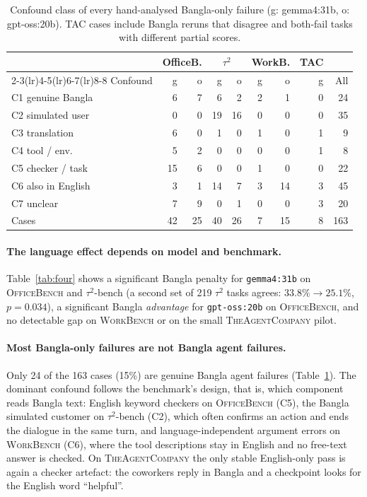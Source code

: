 \documentclass[11pt]{article}
\begin{document}
\begin{table}[t]
\centering\footnotesize
\setlength{\tabcolsep}{2.6pt}
\begin{tabular}{lrrrrrrrr}
\toprule
 & \multicolumn{2}{c}{OfficeB.} & \multicolumn{2}{c}{$\tau^2$} & \multicolumn{2}{c}{WorkB.} & TAC & \\
\cmidrule(lr){2-3}\cmidrule(lr){4-5}\cmidrule(lr){6-7}\cmidrule(lr){8-8}
Confound & g & o & g & o & g & o & g & All \\
\midrule
C1 genuine Bangla    & 6  & 7 & 6  & 2  & 2 & 1  & 0 & 24 \\
C2 simulated user    & 0  & 0 & 19 & 16 & 0 & 0  & 0 & 35 \\
C3 translation       & 6  & 0 & 1  & 0  & 1 & 0  & 1 & 9 \\
C4 tool / env.       & 5  & 2 & 0  & 0  & 0 & 0  & 1 & 8 \\
C5 checker / task    & 15 & 6 & 0  & 0  & 1 & 0  & 0 & 22 \\
C6 also in English   & 3  & 1 & 14 & 7  & 3 & 14 & 3 & 45 \\
C7 unclear           & 7  & 9 & 0  & 1  & 0 & 0  & 3 & 20 \\
\midrule
Cases                & 42 & 25 & 40 & 26 & 7 & 15 & 8 & 163 \\
\bottomrule
\end{tabular}
\caption{Confound class of every hand-analysed Bangla-only failure (g: gemma4:31b, o:
gpt-oss:20b). TAC cases include Bangla reruns that disagree and both-fail tasks with different
partial scores.}
\label{tab:confound}
\end{table}

\paragraph{The language effect depends on model and benchmark.} Table~\ref{tab:four} shows a
significant Bangla penalty for \texttt{gemma4:31b} on \textsc{OfficeBench} and $\tau^2$-bench
(a second set of 219 $\tau^2$ tasks agrees: $33.8\%\to25.1\%$, $p=0.034$), a significant Bangla
\emph{advantage} for \texttt{gpt-oss:20b} on \textsc{OfficeBench}, and no detectable gap on
\textsc{WorkBench} or on the small \textsc{TheAgentCompany} pilot.

\paragraph{Most Bangla-only failures are not Bangla agent failures.} Only 24 of the 163 cases
(15\%) are genuine Bangla agent failures (Table~\ref{tab:confound}). The dominant confound
follows the benchmark's design, that is, which component reads Bangla text: English keyword
checkers on \textsc{OfficeBench} (C5), the Bangla simulated customer on $\tau^2$-bench (C2),
which often confirms an action and ends the dialogue in the same turn, and language-independent
argument errors on \textsc{WorkBench} (C6), where the tool descriptions stay in English and no
free-text answer is checked. On \textsc{TheAgentCompany} the only stable English-only pass is
again a checker artefact: the coworkers reply in Bangla and a checkpoint looks for the English
word ``helpful''.
\end{document}

